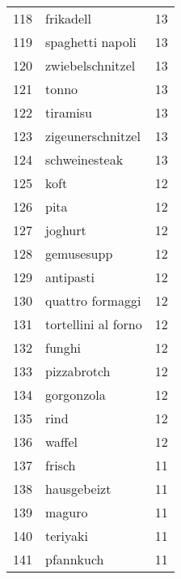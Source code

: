 \begin{tabular}{llr}
118  &                                          frikadell &     13 \\
119  &                                   spaghetti napoli &     13 \\
120  &                                   zwiebelschnitzel &     13 \\
121  &                                              tonno &     13 \\
122  &                                           tiramisu &     13 \\
123  &                                  zigeunerschnitzel &     13 \\
124  &                                      schweinesteak &     13 \\
125  &                                               koft &     12 \\
126  &                                               pita &     12 \\
127  &                                            joghurt &     12 \\
128  &                                         gemusesupp &     12 \\
129  &                                          antipasti &     12 \\
130  &                                   quattro formaggi &     12 \\
131  &                                tortellini al forno &     12 \\
132  &                                             funghi &     12 \\
133  &                                        pizzabrotch &     12 \\
134  &                                         gorgonzola &     12 \\
135  &                                               rind &     12 \\
136  &                                             waffel &     12 \\
137  &                                             frisch &     11 \\
138  &                                        hausgebeizt &     11 \\
139  &                                             maguro &     11 \\
140  &                                           teriyaki &     11 \\
141  &                                          pfannkuch &     11 \\

\end{tabular}

